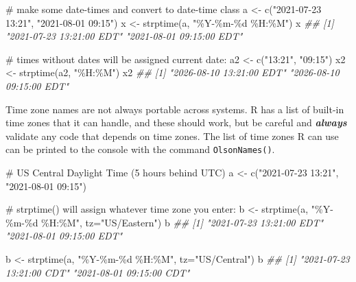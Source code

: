 \documentclass[
  13,
  letterpaper,
]{report}
\newenvironment{Shaded}{\begin{snugshade}}{\end{snugshade}}
\newcommand{\AttributeTok}[1]{\textcolor[rgb]{0.40,0.45,0.13}{#1}}
\newcommand{\CommentTok}[1]{\textcolor[rgb]{0.37,0.37,0.37}{#1}}
\newcommand{\DocumentationTok}[1]{\textcolor[rgb]{0.37,0.37,0.37}{\textit{#1}}}
\newcommand{\FunctionTok}[1]{\textcolor[rgb]{0.28,0.35,0.67}{#1}}
\newcommand{\NormalTok}[1]{\textcolor[rgb]{0.00,0.23,0.31}{#1}}
\newcommand{\OtherTok}[1]{\textcolor[rgb]{0.00,0.23,0.31}{#1}}
\newcommand{\StringTok}[1]{\textcolor[rgb]{0.13,0.47,0.30}{#1}}
\begin{document}
\begin{Shaded}
\begin{Highlighting}[]

\CommentTok{\# make some date{-}times and convert to date{-}time class}
\NormalTok{a }\OtherTok{\textless{}{-}} \FunctionTok{c}\NormalTok{(}\StringTok{"2021{-}07{-}23 13:21"}\NormalTok{, }\StringTok{"2021{-}08{-}01 09:15"}\NormalTok{)}
\NormalTok{x }\OtherTok{\textless{}{-}} \FunctionTok{strptime}\NormalTok{(a, }\StringTok{"\%Y{-}\%m{-}\%d \%H:\%M"}\NormalTok{)}
\NormalTok{x}
\DocumentationTok{\#\# [1] "2021{-}07{-}23 13:21:00 EDT" "2021{-}08{-}01 09:15:00 EDT"}

\CommentTok{\# times without dates will be assigned current date:}
\NormalTok{a2 }\OtherTok{\textless{}{-}} \FunctionTok{c}\NormalTok{(}\StringTok{"13:21"}\NormalTok{, }\StringTok{"09:15"}\NormalTok{)}
\NormalTok{x2 }\OtherTok{\textless{}{-}} \FunctionTok{strptime}\NormalTok{(a2, }\StringTok{"\%H:\%M"}\NormalTok{)}
\NormalTok{x2}
\DocumentationTok{\#\# [1] "2026{-}08{-}10 13:21:00 EDT" "2026{-}08{-}10 09:15:00 EDT"}
\end{Highlighting}
\end{Shaded}

Time zone names are not always portable across systems. R has a list of
built-in time zones that it can handle, and these should work, but be
careful and \textbf{\emph{always}} validate any code that depends on
time zones. The list of time zones R can use can be printed to the
console with the command \texttt{OlsonNames()}.

\begin{Shaded}
\begin{Highlighting}[]

\CommentTok{\# US Central Daylight Time (5 hours behind UTC)}
\NormalTok{a }\OtherTok{\textless{}{-}} \FunctionTok{c}\NormalTok{(}\StringTok{"2021{-}07{-}23 13:21"}\NormalTok{, }\StringTok{"2021{-}08{-}01 09:15"}\NormalTok{)}

\CommentTok{\# strptime() will assign whatever time zone you enter:}
\NormalTok{b }\OtherTok{\textless{}{-}} \FunctionTok{strptime}\NormalTok{(a, }\StringTok{"\%Y{-}\%m{-}\%d \%H:\%M"}\NormalTok{, }\AttributeTok{tz=}\StringTok{"US/Eastern"}\NormalTok{)}
\NormalTok{b}
\DocumentationTok{\#\# [1] "2021{-}07{-}23 13:21:00 EDT" "2021{-}08{-}01 09:15:00 EDT"}

\NormalTok{b }\OtherTok{\textless{}{-}} \FunctionTok{strptime}\NormalTok{(a, }\StringTok{"\%Y{-}\%m{-}\%d \%H:\%M"}\NormalTok{, }\AttributeTok{tz=}\StringTok{"US/Central"}\NormalTok{)}
\NormalTok{b}
\DocumentationTok{\#\# [1] "2021{-}07{-}23 13:21:00 CDT" "2021{-}08{-}01 09:15:00 CDT"}
\end{Highlighting}
\end{Shaded}
\end{document}
